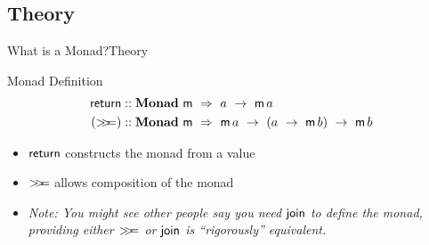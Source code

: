 \documentclass{beamer}
\begin{document}
  \subsection{Theory}
  \begin{frame}{What is a Monad?}{Theory}
    \begin{block}{Monad Definition}
      \begin{align*}
        \return &:: \mathbf{Monad}\ \mathsf{m}\ \Rightarrow\ a\ \rightarrow\ \M{a}\\
        (\bind) &:: \mathbf{Monad}\ \mathsf{m}\ \Rightarrow\ \M{a}\ \rightarrow\ (a\ \rightarrow\ \M{b})\ \rightarrow\ \M{b}\\
      \end{align*}
    \end{block}
    \begin{itemize}
      \item $\mathsf{return}$ constructs the monad from a value\\
      \item $\mathsf{>\!\!>\!\!=}$ allows composition of the monad\\
      \item \textit{Note: You might see other people say you need $\mathsf{join}$ to define the monad,
        providing either $\mathsf{>\!\!>\!\!=}$ or $\mathsf{join}$ is ``rigorously'' equivalent.}
    \end{itemize}
  \end{frame}
\end{document}
